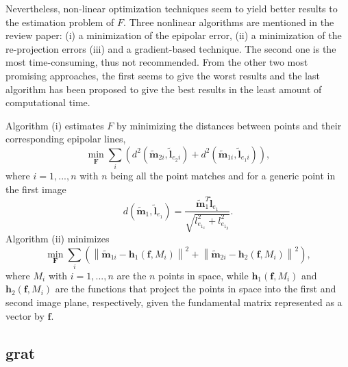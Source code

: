 Nevertheless, non-linear optimization techniques seem to yield better results to the estimation problem of $F$. Three nonlinear algorithms are mentioned in the review paper: (i) a minimization of the epipolar error, (ii) a minimization of the re-projection errors (iii) and a gradient-based technique. The second one is the most time-consuming, thus not recommended. From the other two most promising approaches, the first seems to give the worst results and the last algorithm has been proposed to give the best results in the least amount of computational time. 

Algorithm (i) estimates $F$ by minimizing the distances between points and their corresponding epipolar lines,
\begin{equation}
\label{cha2:sec3:eq:mee}
	\min_{\mathbf{F}} \sum_{i}\left(
	d^{2}(\widetilde{\mathbf{m}}_{2i}, \widetilde{\mathbf{l}}_{e_2i})
	+
	d^{2}(\widetilde{\mathbf{m}}_{1i}, \widetilde{\mathbf{l}}_{e_1i})\right),
\end{equation}
where $i=1,...,n$ with $n$ being all the point matches and for a generic point in the first image
\begin{equation}
\label{cha2:sec3:eq:meed}
	d(\widetilde{\mathbf{m}}_1, \widetilde{\mathbf{l}}_{e_1}) = \frac{\widetilde{\mathbf{m}}_1^T \widetilde{\mathbf{l}}_{e_1}}{\sqrt{l_{e_{1_x}}^2+l_{e_{1_y}}^2}}.
\end{equation}
Algorithm (ii) minimizes 
\begin{equation}
\label{cha2:sec3:eq:al3}
	\min_{\mathbf{F}}\sum_{i}
	\left(
	\left\|\widetilde{\mathbf{m}}_{1i}-\mathbf{h}_1(\mathbf{f}, M_i)\right\|^2
	+
	\left\|\widetilde{\mathbf{m}}_{2i}-\mathbf{h}_2(\mathbf{f}, M_i)\right\|^2\right),
\end{equation}
where $M_i$ with $i=1,...,n$ are the $n$ points in space, while $\mathbf{h}_1(\mathbf{f}, M_i)$ and $\mathbf{h}_2(\mathbf{f}, M_i)$ are the functions that project the points in space into the first and second image plane, respectively, given the fundamental matrix represented as a vector by $\mathbf{f}$.

\subsection{\acrlong{grat}}

